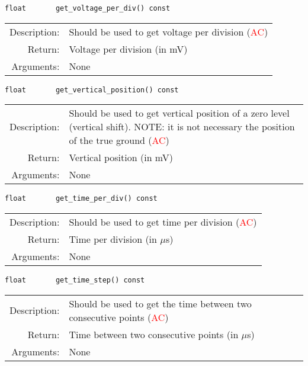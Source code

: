 \begin{lstlisting}
float       get_voltage_per_div() const
\end{lstlisting}
\begin{tabularx}{\textwidth}{rp{11cm}}
    \toprule
    Description: & Should be used to get voltage per division (\textcolor{red}{AC})\\
    Return: & Voltage per division (in mV)\\
    Arguments: & None\\
    \bottomrule
\end{tabularx}
\vspace{1cm}

\begin{lstlisting}
float       get_vertical_position() const
\end{lstlisting}
\begin{tabularx}{\textwidth}{rp{11cm}}
    \toprule
    Description: & Should be used to get vertical position of a zero level (vertical shift). NOTE: it is not necessary the position of the true ground (\textcolor{red}{AC})\\
    Return: & Vertical position (in mV)\\
    Arguments: & None\\
    \bottomrule
\end{tabularx}
\vspace{1cm}

\begin{lstlisting}
float       get_time_per_div() const
\end{lstlisting}
\begin{tabularx}{\textwidth}{rp{11cm}}
    \toprule
    Description: & Should be used to get time per division (\textcolor{red}{AC})\\
    Return: & Time per division (in $\mu$s)\\
    Arguments: & None\\
    \bottomrule
\end{tabularx}
\vspace{1cm}

\begin{lstlisting}
float       get_time_step() const
\end{lstlisting}
\begin{tabularx}{\textwidth}{rp{11cm}}
    \toprule
    Description: & Should be used to get the time between two consecutive points (\textcolor{red}{AC})\\
    Return: & Time between two consecutive points (in $\mu$s)\\
    Arguments: & None\\
    \bottomrule
\end{tabularx}
\vspace{1cm}

